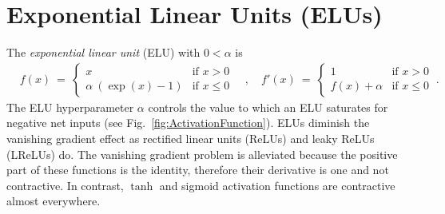 \documentclass{article}
\begin{document}
\section{Exponential Linear Units (ELUs)}
\label{sec:elu}


The {\em exponential linear unit} (ELU) with $0<\alpha$ is
\begin{align}
\label{eq:elu}
&f(x) \ = \
\begin{cases}
x &\mbox{if } x > 0 \\
\alpha \ (\exp(x)-1) & \mbox{if } x \leq 0
\end{cases} \quad ,  \quad
f'(x) \ = \
\begin{cases}
1 &\mbox{if } x > 0 \\
f(x) + \alpha & \mbox{if } x \leq 0
\end{cases} \ .
\end{align}
The ELU hyperparameter $\alpha$ controls the value to
which an ELU saturates for negative net inputs (see Fig.~\ref{fig:ActivationFunction}).
ELUs diminish the vanishing gradient effect
as rectified linear units (ReLUs) and leaky ReLUs
(LReLUs) do.
The vanishing gradient problem is alleviated because
the positive part of these functions is the identity,
therefore their derivative is one and not contractive.
In contrast, $\tanh$ and sigmoid activation functions are contractive
almost everywhere.
\end{document}

